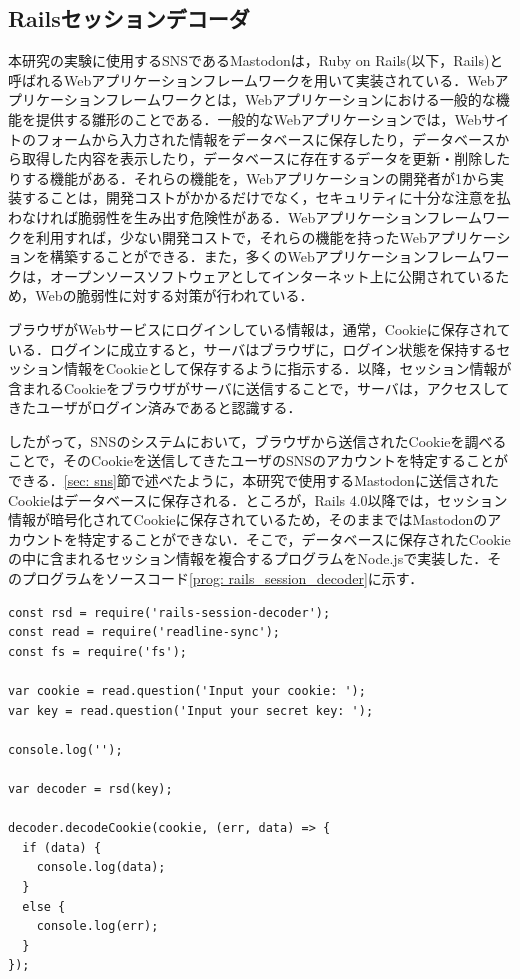 \documentclass[10pt, a4paper]{jreport}
\begin{document}
\subsection{Railsセッションデコーダ}\label{sec: rails_session_decoder}
本研究の実験に使用するSNSであるMastodonは，Ruby on Rails(以下，Rails)と呼ばれるWebアプリケーションフレームワークを用いて実装されている．Webアプリケーションフレームワークとは，Webアプリケーションにおける一般的な機能を提供する雛形のことである．一般的なWebアプリケーションでは，Webサイトのフォームから入力された情報をデータベースに保存したり，データベースから取得した内容を表示したり，データベースに存在するデータを更新・削除したりする機能がある．それらの機能を，Webアプリケーションの開発者が1から実装することは，開発コストがかかるだけでなく，セキュリティに十分な注意を払わなければ脆弱性を生み出す危険性がある．Webアプリケーションフレームワークを利用すれば，少ない開発コストで，それらの機能を持ったWebアプリケーションを構築することができる．また，多くのWebアプリケーションフレームワークは，オープンソースソフトウェアとしてインターネット上に公開されているため，Webの脆弱性に対する対策が行われている．

ブラウザがWebサービスにログインしている情報は，通常，Cookieに保存されている．ログインに成立すると，サーバはブラウザに，ログイン状態を保持するセッション情報をCookieとして保存するように指示する．以降，セッション情報が含まれるCookieをブラウザがサーバに送信することで，サーバは，アクセスしてきたユーザがログイン済みであると認識する．

したがって，SNSのシステムにおいて，ブラウザから送信されたCookieを調べることで，そのCookieを送信してきたユーザのSNSのアカウントを特定することができる．\ref{sec: sns}節で述べたように，本研究で使用するMastodonに送信されたCookieはデータベースに保存される．ところが，Rails 4.0以降では，セッション情報が暗号化されてCookieに保存されている\cite{rails_session_is_encrypted}ため，そのままではMastodonのアカウントを特定することができない．そこで，データベースに保存されたCookieの中に含まれるセッション情報を複合するプログラムをNode.jsで実装した．そのプログラムをソースコード\ref{prog: rails_session_decoder}に示す．

\begin{lstlisting}[caption=Railsセッションデコーダ,label=prog: rails_session_decoder]
const rsd = require('rails-session-decoder');
const read = require('readline-sync');
const fs = require('fs');

var cookie = read.question('Input your cookie: ');
var key = read.question('Input your secret key: ');

console.log('');

var decoder = rsd(key);

decoder.decodeCookie(cookie, (err, data) => {
  if (data) {
    console.log(data);
  }
  else {
    console.log(err);
  }
});
\end{lstlisting}
\end{document}
